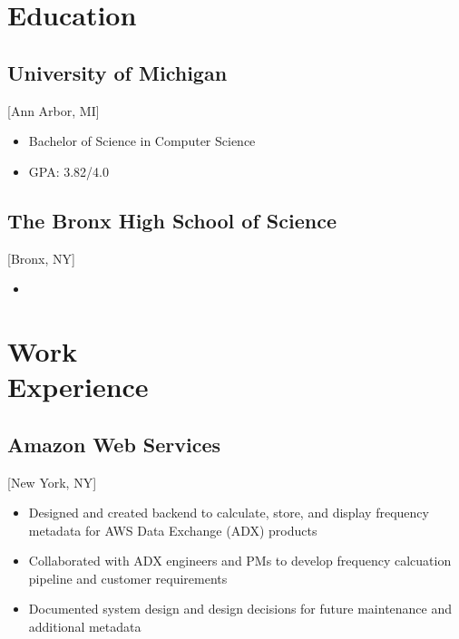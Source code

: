 \documentclass{mycv}
\begin{document}
\maketitle%

\section{Education}

\subsection{University of Michigan}[Ann Arbor, MI]
\vspace{-\parskip}%
\begin{itemize}[label={}]
  \item Bachelor of Science in Computer Science 
  \item GPA: 3.82/4.0
\end{itemize}

\subsection{The Bronx High School of Science}[Bronx, NY]
\vspace{-\parskip}%
\begin{itemize}[label={}]
  \item {}
\end{itemize}

\section{Work\\Experience}

\subsection{Amazon Web Services}[New York, NY]
\begin{positions}
\end{positions}
\begin{itemize}
  \item Designed and created backend to calculate, store, and display frequency metadata for AWS Data Exchange (ADX) products
  \item Collaborated with ADX engineers and PMs to develop frequency calcuation pipeline and customer requirements
  \item Documented system design and design decisions for future maintenance and additional metadata
\end{itemize}
\end{document}
